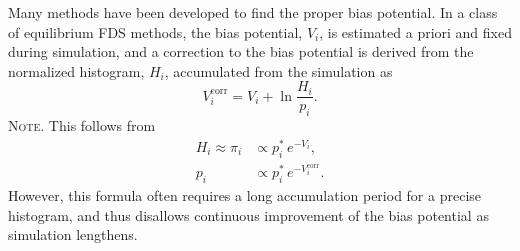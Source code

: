 \documentclass[reprint, superscriptaddress, floatfix]{revtex4-1}
\newcommand{\note}[1]{{\color{DarkGreen}\footnotesize \textsc{Note.} #1}}
\begin{document}
Many methods\cite{mezei1987, berg1992, *lee1993,
wang2001, *wang2001pre, huber1994,
*laio2002, *laio2008, *barducci2011, *sutto2012}
have been developed to find the proper bias potential.
%
In a class of equilibrium FDS methods\cite{
  mezei1987, berg1992, *lee1993, marinari1992, *lyubartsev1992},
the bias potential, $V_i$, is
estimated a priori and fixed
during simulation,
%
and a correction to the bias potential
is derived from the normalized histogram, $H_i$,
accumulated from the simulation as
%
%
\begin{equation}
  V^\mathrm{corr}_i
  =
  V_i
  +
  \ln \frac{ H_i }
           { p_i }.
  \label{eq:vcorr_equil}
\end{equation}
%
\note{This follows from
  $$
  \begin{aligned}
    H_i \approx \pi_i
    &\propto p^*_i \, e^{-V_i},
    \\
    p_i
    &\propto p^*_i \, e^{-V^\mathrm{corr}_i}.
  \end{aligned}
  $$
}
However, this formula often requires a long
accumulation period for a precise histogram,
and thus disallows
continuous improvement of the bias potential
as simulation lengthens.
\end{document}
